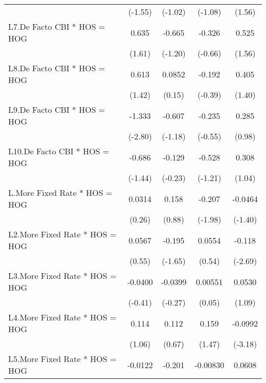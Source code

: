 {\begin{longtable}{l*{4}{c}}
                &  (-1.55)         &  (-1.02)         &  (-1.08)         &   (1.56)         \\
\addlinespace
L7.De Facto CBI * HOS = HOG&    0.635         &   -0.665         &   -0.326         &    0.525         \\
                &   (1.61)         &  (-1.20)         &  (-0.66)         &   (1.56)         \\
\addlinespace
L8.De Facto CBI * HOS = HOG&    0.613         &   0.0852         &   -0.192         &    0.405         \\
                &   (1.42)         &   (0.15)         &  (-0.39)         &   (1.40)         \\
\addlinespace
L9.De Facto CBI * HOS = HOG&   -1.333\sym{**} &   -0.607         &   -0.235         &    0.285         \\
                &  (-2.80)         &  (-1.18)         &  (-0.55)         &   (0.98)         \\
\addlinespace
L10.De Facto CBI * HOS = HOG&   -0.686         &   -0.129         &   -0.528         &    0.308         \\
                &  (-1.44)         &  (-0.23)         &  (-1.21)         &   (1.04)         \\
\addlinespace
L.More Fixed Rate * HOS = HOG&   0.0314         &    0.158         &   -0.207\sym{*}  &  -0.0464         \\
                &   (0.26)         &   (0.88)         &  (-1.98)         &  (-1.40)         \\
\addlinespace
L2.More Fixed Rate * HOS = HOG&   0.0567         &   -0.195         &   0.0554         &   -0.118\sym{**} \\
                &   (0.55)         &  (-1.65)         &   (0.54)         &  (-2.69)         \\
\addlinespace
L3.More Fixed Rate * HOS = HOG&  -0.0400         &  -0.0399         &  0.00551         &   0.0530         \\
                &  (-0.41)         &  (-0.27)         &   (0.05)         &   (1.09)         \\
\addlinespace
L4.More Fixed Rate * HOS = HOG&    0.114         &    0.112         &    0.159         &  -0.0992\sym{**} \\
                &   (1.06)         &   (0.67)         &   (1.47)         &  (-3.18)         \\
\addlinespace
L5.More Fixed Rate * HOS = HOG&  -0.0122         &   -0.201         & -0.00830         &   0.0608         \\

\end{longtable}}

